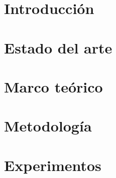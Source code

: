 \documentclass[12pt,oneside,reqno]{report}
\begin{document}


\maketitlepage
\newpage\null\thispagestyle{empty}\newpage

\initializefrontsections     %



\tableofcontents
\listoffigures             %
\listoftables              %
\listofabbreviations         %
\newpage\null\thispagestyle{empty}\newpage

\startthechapters            %

\chapter{Introducción}\label{cap:introduccion}


\chapter{Estado del arte}\label{cap:estado-del-arte}


\chapter{Marco teórico}\label{cap:marco-teorico}


\chapter{Metodología}\label{cap:metodologia}


\chapter{Experimentos}\label{cap:experimentos}

\end{document}
